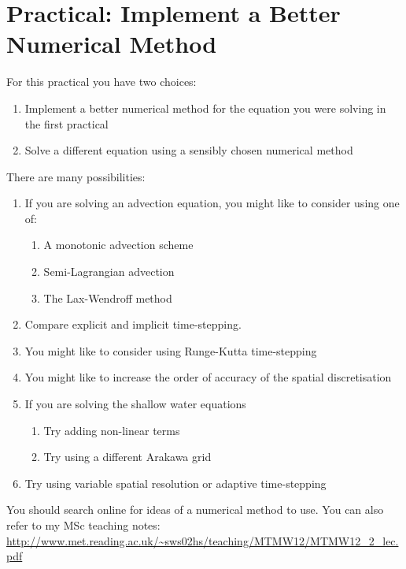 \clearpage{}

\section{Practical: Implement a Better Numerical Method }

For this practical you have two choices:
\begin{enumerate}
\item Implement a better numerical method for the equation you were solving
in the first practical
\item Solve a different equation using a sensibly chosen numerical method
\end{enumerate}
There are many possibilities:
\begin{enumerate}
\item If you are solving an advection equation, you might like to consider
using one of:

\begin{enumerate}
\item A monotonic advection scheme
\item Semi-Lagrangian advection
\item The Lax-Wendroff method
\end{enumerate}
\item Compare explicit and implicit time-stepping.
\item You might like to consider using Runge-Kutta time-stepping
\item You might like to increase the order of accuracy of the spatial discretisation
\item If you are solving the shallow water equations

\begin{enumerate}
\item Try adding non-linear terms
\item Try using a different Arakawa grid
\end{enumerate}
\item Try using variable spatial resolution or adaptive time-stepping
\end{enumerate}
You should search online for ideas of a numerical method to use. You
can also refer to my MSc teaching notes:\\
 \url{http://www.met.reading.ac.uk/~sws02hs/teaching/MTMW12/MTMW12_2_lec.pdf}
